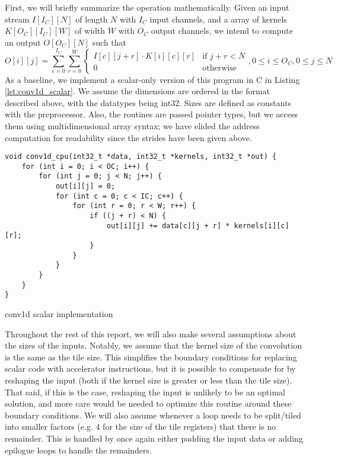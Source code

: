 \documentclass[acmsmall, nonacm=true]{acmart}
\begin{document}
First, we will briefly summarize the operation mathematically. Given an input stream $I[I_C][N]$ of length $N$ with $I_C$ input channels, and a array of kernels $K[O_C][I_C][W]$ of width $W$ with $O_C$ output channels, we intend to compute an output $O[O_C][N]$ such that
$$ O[i][j] = \sum_{c = 0}^{I_C} \sum_{r = 0}^{W} \begin{cases} I[c][j+r] \cdot K[i][c][r] & \text{if } j+r<N \\ 0 & \text{otherwise} \end{cases}, 0 \leq i \leq O_C, 0 \leq j \leq N $$
As a baseline, we implement a scalar-only version of this program in C in Listing \ref{lst:conv1d_scalar}. We assume the dimensions are ordered in the format described above, with the datatypes being int32. Sizes are defined as constants with the preprocessor. Also, the routines are passed pointer types, but we access them using multidimensional array syntax; we have elided the address computation for readability since the strides have been given above.

\begin{listing}
    \centering
    \begin{verbatim}
void conv1d_cpu(int32_t *data, int32_t *kernels, int32_t *out) {
    for (int i = 0; i < OC; i++) {
        for (int j = 0; j < N; j++) {
            out[i][j] = 0;
            for (int c = 0; c < IC; c++) {
                for (int r = 0; r < W; r++) {
                    if ((j + r) < N) {
                        out[i][j] += data[c][j + r] * kernels[i][c][r];
                    }                    
                }
            }
        }
    }
}
\end{verbatim}
    \caption{conv1d scalar implementation}
    \label{lst:conv1d_scalar}
\end{listing}

Throughout the rest of this report, we will also make several assumptions about the sizes of the inputs. Notably, we assume that the kernel size of the convolution is the same as the tile size. This simplifies the boundary conditions for replacing scalar code with accelerator instructions, but it is possible to compensate for by reshaping the input (both if the kernel size is greater or less than the tile size). That said, if this is the case, reshaping the input is unlikely to be an optimal solution, and more care would be needed to optimize this routine around these boundary conditions. We will also assume whenever a loop needs to be split/tiled into smaller factors (e.g. 4 for the size of the tile registers) that there is no remainder. This is handled by once again either padding the input data or adding epilogue loops to handle the remainders.
\end{document}
